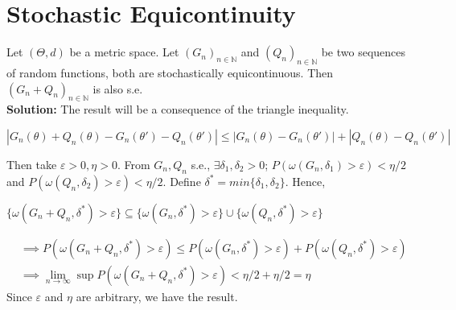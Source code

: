 \documentclass[11pt,letterpaper]{article}                  %
\begin{document}

\section{Stochastic Equicontinuity}
\begin{problem}
Let $(\Theta, d)$ be a metric space. Let $(G_n)_{n \in \mathbb{N}}$ and $(Q_n)_{n \in \mathbb{N}}$ be two sequences of random functions, both are stochastically equicontinuous. Then $(G_n + Q_n)_{n \in \mathbb{N}}$ is also s.e.\\

\textbf{Solution:} The result will be a consequence of the triangle inequality.
\begin{center}
$|G_n(\theta)+Q_n(\theta)-G_n(\theta')-Q_n(\theta')|\leq |G_n(\theta)-G_n(\theta')|+|Q_n(\theta)-Q_n(\theta')|$
\end{center}
Then take $\varepsilon>0, \eta>0$. From $G_n, Q_n$ s.e., $\exists \delta_1,\delta_2>0$; $P(\omega(G_n,\delta_1)>\varepsilon)<\eta/2$ and $P(\omega(Q_n,\delta_2)>\varepsilon)<\eta/2$. Define $\delta^*=min\{\delta_1,\delta_2\}$. Hence,
\begin{center}
$\{\omega(G_n+Q_n,\delta^*)>\varepsilon\} \subseteq \{\omega(G_n,\delta^*)>\varepsilon\} \cup \{\omega(Q_n,\delta^*)>\varepsilon\}$
\end{center}
\begin{align*}
&\implies P(\omega(G_n+Q_n,\delta^*)>\varepsilon)\leq P(\omega(G_n,\delta^*)>\varepsilon) + P(\omega(Q_n,\delta^*)>\varepsilon)\\
&\implies \lim_{n\to\infty}\sup P(\omega(G_n+Q_n,\delta^*)>\varepsilon) < \eta/2+\eta/2=\eta
\end{align*}
Since $\varepsilon$ and $\eta$ are arbitrary, we have the result.
\end{problem}
\end{document}
